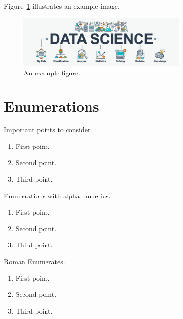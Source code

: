 Figure~\ref{fig:example} illustrates an example image.

\begin{figure}[h]
	\centering
	\includegraphics[width=0.75\textwidth]{img/data-science}
	\caption{An example figure.}
	\label{fig:example}
\end{figure}

\section{Enumerations}
Important points to consider:
\begin{enumerate}
	\item First point.
	\item Second point.
	\item Third point.
\end{enumerate}

Enumerations with alpha numerics.
\begin{enumerate}[label={(\alph*)}]
	\item First point.
	\item Second point.
	\item Third point.
\end{enumerate}


Roman Enumerates.

\begin{enumerate}[label={(\roman*)}]
	\item First point.
	\item Second point.
	\item Third point.
\end{enumerate}